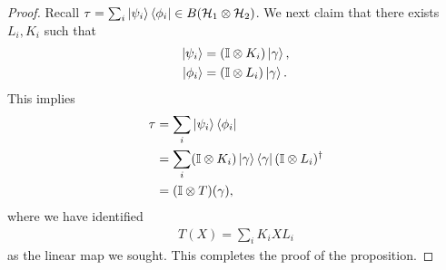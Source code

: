 \documentclass[10pt,oneside,longbibliography]{report}
\begin{document}
\begin{tcolorbox}[colframe=black,breakable, colback=black!5, arc=0pt, outer arc=0pt,boxrule=0.5pt]
\begin{proof}
Recall $\tau = \sum_i \ket{\psi_i}\bra{\phi_i} \in B(\mathcal{H}_1 \otimes \mathcal{H}_2)$. We next claim that there exists $L_i, K_i$ such that 
\begin{align}
    \ket{\psi_i}&=(\mathbb{I}\otimes K_i)\ket{\gamma},\\
    \ket{\phi_i}&=(\mathbb{I}\otimes L_i)\ket{\gamma}.\\
\end{align}
This implies
\begin{align}
    \tau &= \sum_i \ket{\psi_i}\bra{\phi_i} \\
    &=\sum_i (\mathbb{I}\otimes K_i) \ket{\gamma}\bra{\gamma}(\mathbb{I}\otimes L_i)^{\dagger} \\
    &= (\mathbb{I} \otimes T)(\gamma),
\end{align}
where we have identified 
\begin{align}
    T(X)=\sum_i K_i X L_i
\end{align}
as the linear map we sought. This completes the proof of the proposition. 
\end{proof}
\end{tcolorbox}
\end{document}
